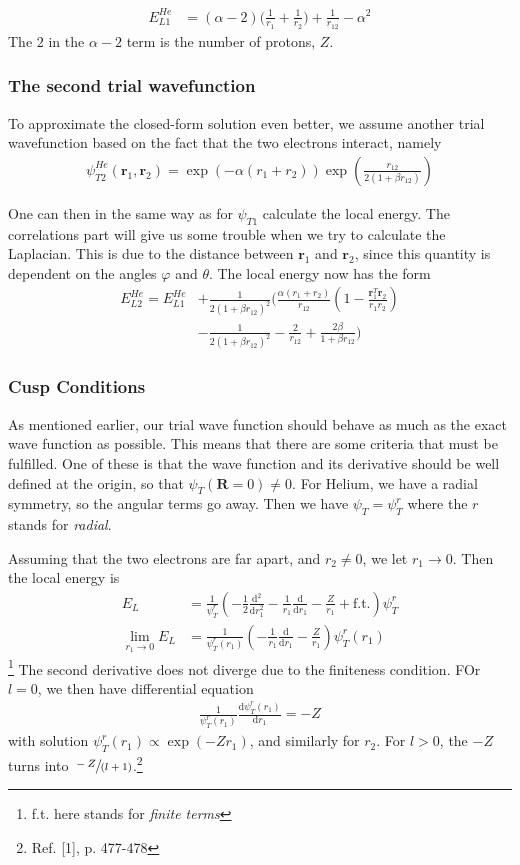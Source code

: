 \documentclass[twocolumns, a4paper,11pt,fleqn]{extarticle}
\newcommand{\eq}[1]{{\small\begin{align*}#1\end{align*}}}
\renewcommand\vec[1]{\boldsymbol{\mathbf{#1}}}
\begin{document}
\eq{
  E_{L1}^{He}
  &=(\alpha-2)\bigg( \frac{1}{r_1}+\frac{1}{r_2} \bigg)
    +\frac{1}{r_{12}}-\alpha^2
}
The $2$ in the $\alpha-2$ term is the number of protons, $Z$.

\subsubsection{The second trial wavefunction}
To approximate the closed-form solution even better,
we assume another trial wavefunction based on the fact that
the two electrons interact, namely
\eq{
  \psi_{T2}^{He} (\vec r_1,\vec r_2)
    =\exp{\left(-\alpha(r_1+r_2)\right)}
    \exp{\left(\frac{r_{12}}{2(1+\beta r_{12})}\right)}
}

One can then in the same way as for $\psi_{T1}$ calculate
the local energy. The correlations part will give us some trouble
when we try to calculate the Laplacian. This is due to
the distance between $\vec r_1$ and $\vec r_2$, since this quantity
is dependent on the angles $\varphi$ and $\theta$.
The local energy now has the form
\eq{
	E_{L2}^{He} = E_{L1}^{He}&+\frac{1}{2(1+\beta r_{12})^2}
	\bigg(\frac{\alpha(r_1+r_2)}{r_{12}}(1-
	\frac{\mathbf{r}_1^T\mathbf{r}_2}{r_1r_2})\\
	&-\frac{1}{2(1+\beta r_{12})^2}-\frac{2}{r_{12}}+
	\frac{2\beta}{1+\beta r_{12}}\bigg)
}

\subsubsection{Cusp Conditions}
As mentioned earlier, our trial wave function should behave as much
as the exact wave function as possible.
This means that there are some criteria that must be fulfilled.
One of these is that the wave function and its derivative
should be well defined at the origin,
so that $\psi_T(\vec R = 0)\neq 0$.
For Helium, we have a radial symmetry, so the angular terms go away.
Then we have $\psi_T = \psi_T^r$ where the $r$ stands for \textit{radial}.

Assuming that the two electrons are far apart, and $r_2 \neq 0$,
we let $r_1 \rightarrow 0$. Then the local energy is
\eq{E_L &=
  \frac{1}{\psi_T^{r}}\left( -\frac{1}{2}\frac{\mathrm d^2}{\mathrm d r_1^2}
  - \frac{1}{r_1}\frac{\mathrm d}{\mathrm d r_1} - \frac{Z}{r_1} + \text{f.t.}
  \right)\psi_T^{r}\\
  \lim_{r_1\rightarrow 0} E_L &=\frac{1}{\psi_T^{r}(r_1)}
  \left(- \frac{1}{r_1}\frac{\mathrm d}{\mathrm d r_1} 
  - \frac{Z}{r_1}\right)\psi_T^{r}(r_1)
}\footnote{f.t. here stands for \textit{finite terms}}
The second derivative does not diverge due to the finiteness condition.
FOr $l=0$, we then have differential equation
\eq{
  \frac{1}{\psi_T^{r}(r_1)}\frac{\mathrm d \psi_T^{r}(r_1)}{\mathrm d r_1}
  = -Z
}
with solution $\psi_T^{r}(r_1) \propto \exp(-Zr_1)$, and similarly for $r_2$.
For $l>0$, the $-Z$ turns into $\sfrac{-Z}{(l+1)}$.\footnote{Ref. [1], p. 477-478}
\end{document}
